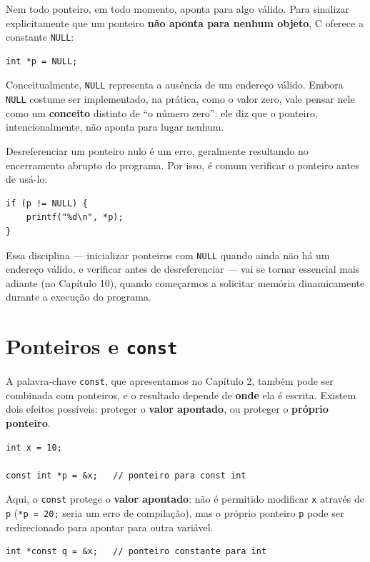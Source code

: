 Nem todo ponteiro, em todo momento, aponta para algo válido. Para sinalizar explicitamente que um ponteiro \textbf{não aponta para nenhum objeto}, C oferece a constante \texttt{NULL}:

\begin{lstlisting}
int *p = NULL;
\end{lstlisting}

Conceitualmente, \texttt{NULL} representa a ausência de um endereço válido. Embora \texttt{NULL} costume ser implementado, na prática, como o valor zero, vale pensar nele como um \textbf{conceito} distinto de ``o número zero'': ele diz que o ponteiro, intencionalmente, não aponta para lugar nenhum.

Desreferenciar um ponteiro nulo é um erro, geralmente resultando no encerramento abrupto do programa. Por isso, é comum verificar o ponteiro antes de usá-lo:

\begin{lstlisting}
if (p != NULL) {
    printf("%d\n", *p);
}
\end{lstlisting}

Essa disciplina — inicializar ponteiros com \texttt{NULL} quando ainda não há um endereço válido, e verificar antes de desreferenciar — vai se tornar essencial mais adiante (no Capítulo 10), quando começarmos a solicitar memória dinamicamente durante a execução do programa.

\section{Ponteiros e \texttt{const}}

A palavra-chave \texttt{const}, que apresentamos no Capítulo 2, também pode ser combinada com ponteiros, e o resultado depende de \textbf{onde} ela é escrita. Existem dois efeitos possíveis: proteger o \textbf{valor apontado}, ou proteger o \textbf{próprio ponteiro}.

\begin{lstlisting}
int x = 10;

const int *p = &x;   // ponteiro para const int
\end{lstlisting}

Aqui, o \texttt{const} protege o \textbf{valor apontado}: não é permitido modificar \texttt{x} através de \texttt{p} (\texttt{*p = 20;} seria um erro de compilação), mas o próprio ponteiro \texttt{p} pode ser redirecionado para apontar para outra variável.

\begin{lstlisting}
int *const q = &x;   // ponteiro constante para int
\end{lstlisting}

